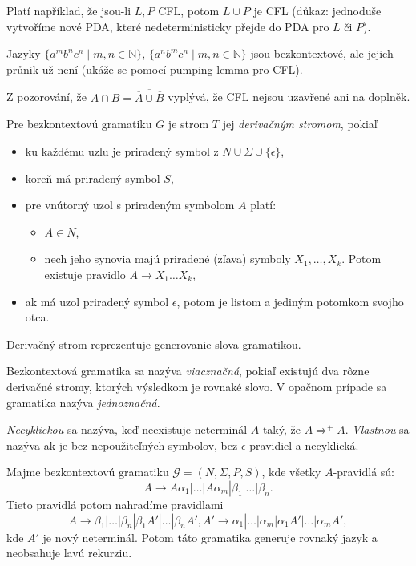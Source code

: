 Platí například, že jsou-li $L, P$ CFL, potom $L \cup P$ je CFL (důkaz:
jednoduše vytvoříme nové PDA, které nedeterministicky přejde do PDA pro
$L$ či $P$).

\begin{example}
    Jazyky
    $\{ a^m b^n c^n \mid m, n \in \mathbb{N} \}$,
    $\{ a^n b^m c^n \mid m, n \in \mathbb{N} \}$
    jsou bezkontextové, ale
    jejich průnik už není (ukáže se pomocí pumping lemma pro CFL).

    Z pozorování, že
    $A \cap B = \overline{\overline{A} \cup \overline{B}}$
    vyplývá, že CFL nejsou uzavřené ani na doplněk.
\end{example}

\begin{definition}
	Pre bezkontextovú gramatiku $G$ je strom $T$ jej 
	{\em derivačným stromom}, pokiaľ 
	\begin{itemize}
		\item ku každému uzlu je priradený symbol z $N \cup \Sigma \cup \{ \epsilon \}$,
		\item koreň má priradený symbol $S$,
		\item pre vnútorný uzol s priradeným symbolom $A$ platí:
		\begin{itemize}
			\item $A \in N$,
			\item nech jeho synovia majú priradené (zľava) symboly $X_1, \ldots, X_k$. Potom existuje pravidlo $A \to X_1\ldots X_k$,
		\end{itemize}
		\item ak má uzol priradený symbol $\epsilon$, potom je listom a jediným potomkom svojho otca.
	\end{itemize}
\end{definition}

Derivačný strom reprezentuje generovanie slova gramatikou.

Bezkontextová gramatika sa nazýva {\em viacznačná}, pokiaľ
existujú dva rôzne derivačné stromy, ktorých výsledkom je rovnaké slovo.
V opačnom prípade sa gramatika nazýva {\em jednoznačná}.

{\em Necyklickou} sa nazýva, keď neexistuje neterminál $A$ taký,
že $A \Rightarrow^+ A$. {\em Vlastnou} sa nazýva ak je bez nepoužiteľných symbolov,
bez $\epsilon$-pravidiel a necyklická.

\begin{lemma}
	Majme bezkontextovú gramatiku $\mathcal{G}=(N, \Sigma, P, S)$,
	kde všetky $A$-pravidlá sú:
	\[
		A \to A\alpha_1|\ldots|A\alpha_m|\beta_1|\ldots|\beta_n.
	\]
	Tieto pravidlá potom nahradíme pravidlami
	\[
		A \to \beta_1|\ldots|\beta_n|\beta_1A'|\ldots|\beta_nA', A' \to \alpha_1|\ldots|\alpha_m|\alpha_1A'|\ldots|\alpha_mA',
	\]
	kde $A'$ je nový neterminál. Potom táto gramatika generuje
	rovnaký jazyk a neobsahuje ľavú rekurziu.
\end{lemma}

